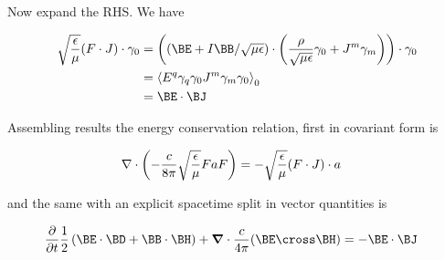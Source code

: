 Now expand the RHS.  We have

\begin{align*}
\sqrt{\frac{\epsilon}{\mu}}
(F \cdot J) \cdot \gamma_0
&=
\left((\BE + I \BB/\sqrt{\mu\epsilon}) \cdot \left( \frac{\rho}{\sqrt{\mu\epsilon}} \gamma_0 + J^m \gamma_m \right) \right) \cdot \gamma_0  \\
&=
\gpgradezero{E^q \gamma_q \gamma_0 J^m \gamma_m \gamma_0} \\
&=
\BE \cdot \BJ
\end{align*}

Assembling results the energy conservation relation, first in covariant form is

\begin{align}\label{eqn:foo12}
\nabla \cdot \left( -\frac{c}{8 \pi} \sqrt{\frac{\epsilon}{\mu}} F a F \right) &= - \sqrt{\frac{\epsilon}{\mu}}(F \cdot J) \cdot a
\end{align}

and the same with an explicit spacetime split in vector quantities is

\begin{align}\label{eqn:foo13}
\frac{\partial}{\partial t} \frac{1}{2} \left(\BE \cdot \BD + \BB \cdot \BH \right) + \spacegrad \cdot \frac{c}{4\pi}(\BE \cross \BH)
&=
-\BE \cdot \BJ
\end{align}

%

\EndArticle
